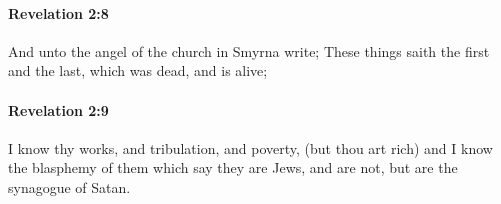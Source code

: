 		\paragraph{Revelation 2:8} %
			\label{REVELATIONNT-2-8}

			And unto the angel of the church in Smyrna write; These things saith the first and the last, which was dead, and is alive;

			\begin{framed}
			\scriptsize
				\begin{compactdesc}
					\item[SBLG] 
				\end{compactdesc}
			\end{framed}

		\paragraph{Revelation 2:9} %
			\label{REVELATIONNT-2-9}

			I know thy works, and tribulation, and poverty, (but thou art rich) and I know the blasphemy of them which say they are Jews, and are not, but are the synagogue of Satan.

